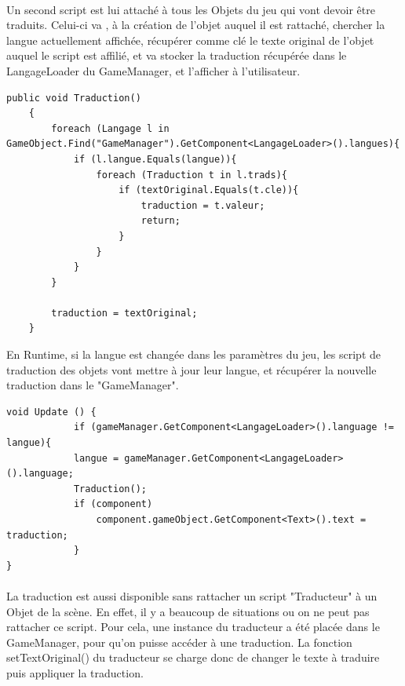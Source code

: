 \documentclass{report}
\begin{document}
\paragraph{}


Un second script est lui attaché à tous les Objets du jeu qui vont devoir être traduits. Celui-ci va , à la création de l'objet auquel il est rattaché, chercher la langue actuellement affichée, récupérer comme clé le texte original de l'objet auquel le script est affilié, et va stocker la traduction récupérée dans le LangageLoader du GameManager, et l'afficher à l’utilisateur.

\begin{lstlisting}[frame=single]
   public void Traduction()
    {
        foreach (Langage l in GameObject.Find("GameManager").GetComponent<LangageLoader>().langues){
            if (l.langue.Equals(langue)){
                foreach (Traduction t in l.trads){
                    if (textOriginal.Equals(t.cle)){
                        traduction = t.valeur;
                        return;
                    }
                }
            }
        }

        traduction = textOriginal;
    }
\end{lstlisting}

En Runtime, si la langue est changée dans les paramètres du jeu, les script de traduction des objets vont mettre à jour leur langue, et récupérer la nouvelle traduction dans le "GameManager".

\begin{lstlisting}[frame=single]
void Update () {
            if (gameManager.GetComponent<LangageLoader>().language != langue){
            langue = gameManager.GetComponent<LangageLoader>().language;
            Traduction();
            if (component)
                component.gameObject.GetComponent<Text>().text = traduction;
            }
}
\end{lstlisting}

\paragraph{}
La traduction est aussi disponible sans rattacher un script "Traducteur" à un Objet de la scène.
En effet, il y a beaucoup de situations ou on ne peut pas rattacher ce script. Pour cela, une instance du traducteur a été placée dans le GameManager, pour qu'on puisse accéder à une traduction.
La fonction setTextOriginal() du traducteur se charge donc de changer le texte à traduire puis appliquer la traduction.
\end{document}
